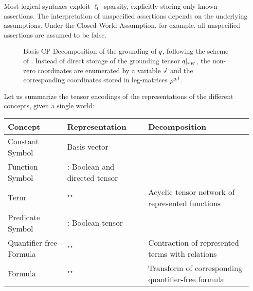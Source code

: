 Most logical syntaxes exploit $\ell_0$-sparsity, explicitly storing only known assertions.
The interpretation of unspecified assertions depends on the underlying assumptions.
Under the Closed World Assumption, for example, all unspecified assertions are assumed to be false.

\begin{figure}[t]
    \begin{center}
        
    \end{center}
    \caption{Basis CP Decomposition of the grounding of $q$, following the scheme of .
    Instead of direct storage of the grounding tensor ${q}|_{x_{W}}$, the non-zero coordinates are enumerated by a variable $J$ and the corresponding coordinates stored in leg-matrices $\rho^{q,l}$.}
    \label{fig:groundingCP}
\end{figure}


Let us summarize the tensor encodings of the representations of the different concepts, given a single \firstOrderLogic{} world:
\begin{center}
    \begin{tabular}{|p{\threecolumnwidth}|p{\threecolumnwidth}|p{\threecolumnwidth}|}
        \hline
        \textbf{Concept}        & \textbf{Representation}                       & \textbf{Decomposition}                             \\
        \hline
        Constant Symbol         & Basis vector                                  &                                                    \\
        \hline
        Function Symbol         & \BasisEncoding{}: Boolean and directed tensor &                                                    \\
        Term                    & ""                                            & Acyclic tensor network of represented functions    \\
        \hline
        Predicate Symbol        & \CoordinateEncoding{}: Boolean tensor         &                                                    \\
        Quantifier-free Formula & ""                                            & Contraction of represented terms with relations    \\
        Formula                 & ""                                            & Transform of corresponding quantifier-free formula \\
        \hline
    \end{tabular}
\end{center}


